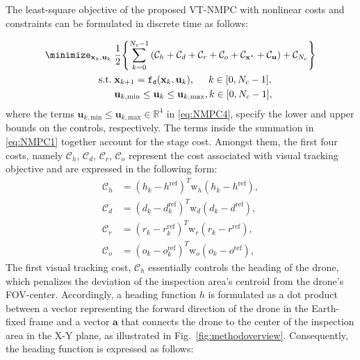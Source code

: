 The least-square objective of the proposed \ac{VT-NMPC} with nonlinear costs and constraints can be formulated in discrete time as follows:

%
\begin{subequations} \label{eq:NMPC}
\begin{align}
	\minimize_{\mathbf{x}_k,\mathbf{u}_k} \; & \frac{1}{2} \Biggl\{\sum_{k = 0}^{N_c-1} \left( \mathcal{C}_{h}
	+\mathcal{C}_{{d}} +\mathcal{C}_{{r}} + \mathcal{C}_{{o}} + \mathcal{C}_{\mathbf{x}^*}+ \mathcal{C}_{\mathbf{u}}\right) + \mathcal{C}_{N_c} 
	\Biggr\} \label{eq:NMPC1} \\
	\textrm{s.t.} \; & \mathbf{x}_{k+1} = \mathtt{f_d}(\mathbf{x}_k,\mathbf{u}_k), \hspace{0.5cm} k \in [0, N_c-1],  \label{eq:NMPC2} \\
    & \mathbf{u}_{k,\textrm{min}} \leq \mathbf{u}_k \leq \mathbf{u}_{k,\textrm{max}}, k \in [0, N_c-1], \label{eq:NMPC4}
\end{align}
\end{subequations}
%
where the terms $\mathbf{u}_{k,\textrm{min}} \leq \mathbf{u}_{k,\textrm{max}} \in \mathbb{R}^{4}$ in \eqref{eq:NMPC4}, specify the lower and upper bounds on the controls, respectively. The terms inside the summation in \eqref{eq:NMPC1} together account for the stage cost. Amongst them, the first four costs, namely $\mathcal{C}_{h}$, $\mathcal{C}_{d}$, $\mathcal{C}_{r}$, $\mathcal{C}_{o}$ represent the cost associated with visual tracking objective and are expressed in the following form: 
%
\begin{align} 
	\mathcal{C}_{h} &= (h_k - h^{\textrm{ref}})^T\mathrm{w}_{h}(h_k - h^\textrm{ref}), \label{eq:NMPC1_stageCostVisual_head} \\
	\mathcal{C}_{d} &= (d_k - d_k^{\textrm{ref}})^T\mathrm{w}_{d}(d_k - d^{\textrm{ref}}),  \label{eq:NMPC1_stageCostVisual_dist} 
	\\
	\mathcal{C}_{r} &= (r_k - r_k^{\textrm{ref}})^T\mathrm{w}_{r}(r_k - r^{\textrm{ref}}),  \label{eq:NMPC1_stageCostVisual_roi}
	\\
	\mathcal{C}_{o} &= (o_k - o_k^{\textrm{ref}})^T\mathrm{w}_{o}(o_k - o^{\textrm{ref}}),  \label{eq:NMPC1_stageCostVisual_oi}
\end{align}
%
The first visual tracking cost, $\mathcal{C}_{h}$ essentially controls the heading of the drone, which penalizes the deviation of the inspection area's centroid from the drone's \ac{FOV}-center. Accordingly, a heading function $h$ is formulated as a dot product between a vector representing the forward direction of the drone in the Earth-fixed frame and a vector $\mathbf{a}$ that connects the drone to the center of the inspection area in the X-Y plane, as illustrated in Fig.~\ref{fig:methodoverview}. Consequently, the heading function is expressed as follows:
